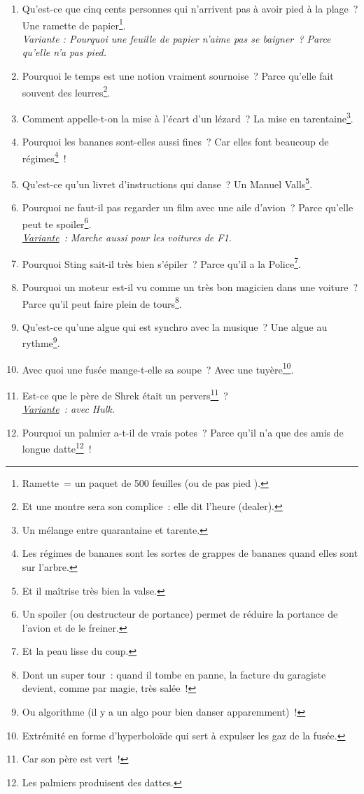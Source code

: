 \documentclass[10pt,a5paper,fullpage]{book}
\begin{document}
\begin{enumerate}
		\item Qu’est-ce que cinq cents personnes qui n’arrivent pas à avoir pied à la plage~? Une ramette de papier\footnote{Ramette = un paquet de 500 feuilles (ou de \guillemotleft pas pied \guillemotright).}.
		\\\textit{Variante : Pourquoi une feuille de papier n’aime pas se baigner~? Parce qu’elle n’a pas pied.}
		\item Pourquoi le temps est une notion vraiment sournoise~? Parce qu’elle fait souvent des leurres\footnote{Et une montre sera son complice~: elle dit l'heure (dealer).}.
		\item Comment appelle-t-on la mise à l’écart d’un lézard~? La mise en tarentaine\footnote{Un mélange entre quarantaine et tarente.}.
		\item Pourquoi les bananes sont-elles aussi fines~? Car elles font beaucoup de régimes\footnote{Les régimes de bananes sont les sortes de grappes de bananes quand elles sont sur l'arbre.}~!
		\item Qu’est-ce qu’un livret d’instructions qui danse~? Un Manuel Valls\footnote{Et il maîtrise très bien la valse.}.
		\item Pourquoi ne faut-il pas regarder un film avec une aile d’avion~? Parce qu’elle peut te spoiler\footnote{Un spoiler (ou destructeur de portance) permet de réduire la portance de l'avion et de le freiner.}. \\\textit{\underline{Variante}~: Marche aussi pour les voitures de F1.}
		\item Pourquoi Sting sait-il très bien s’épiler~? Parce qu’il a la Police\footnote{Et la peau lisse du coup.}. 
		\item Pourquoi un moteur est-il vu comme un très bon magicien dans une voiture~? Parce qu'il peut faire plein de tours\footnote{Dont un super tour~: quand il tombe en panne, la facture du garagiste devient, comme par magie, très salée~!}.
		\item Qu’est-ce qu’une algue qui est synchro avec la musique~? Une algue au rythme\footnote{Ou algorithme (il y a un algo pour bien danser apparemment)~!}.
		\item Avec quoi une fusée mange-t-elle sa soupe~? Avec une tuyère\footnote{Extrémité en forme d’hyperboloïde qui sert à expulser les gaz de la fusée.}.
		\item Est-ce que le père de Shrek était un pervers\footnote{Car son père est vert~!}~? \\\textit{\underline{Variante}~: avec Hulk.}
		\item Pourquoi un palmier a-t-il de vrais potes~? Parce qu’il n’a que des amis de longue datte\footnote{Les palmiers produisent des dattes.}~!

\end{enumerate}
\end{document}

